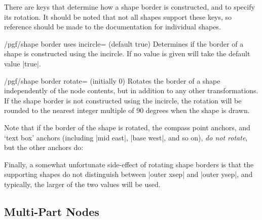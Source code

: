 There are \pgfname{} keys that determine how a shape border is constructed, and
to specify its rotation. It should be noted that not all shapes support these
keys, so reference should be made to the documentation for individual shapes.

\begin{key}{/pgf/shape border uses incircle= (default true)}
    Determines if the border of a shape is constructed using the incircle. If
    no value is given  will take the default value |true|.
\end{key}

\begin{key}{/pgf/shape border rotate= (initially 0)}
    Rotates the border of a shape independently of the node contents, but in
    addition to any other transformations. If the shape border is not
    constructed using the incircle, the rotation will be rounded to the nearest
    integer multiple of 90 degrees when the shape is drawn.
\end{key}

Note that if the border of the shape is rotated, the compass point anchors, and
`text box' anchors (including |mid east|, |base west|, and so on), \emph{do not
rotate}, but the other anchors do:
%
\begin{codeexample}[preamble={\usetikzlibrary{shapes.geometric}}]
\end{codeexample}

Finally, a somewhat unfortunate side-effect of rotating shape borders is that
the supporting shapes do not distinguish between |outer xsep| and |outer ysep|,
and typically, the larger of the two values will be used.


\subsection{Multi-Part Nodes}
\label{section-nodes-multi}

